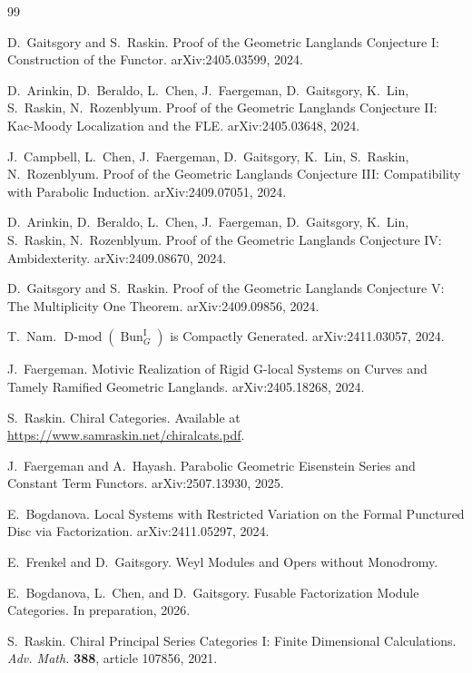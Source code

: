 \documentclass[10pt]{amsart}
\theoremstyle{remark}
\newcommand{\on}[1]{\operatorname{#1}}
\newcommand{\Bun}{\on{Bun}}
\newcommand{\Dmod}{\on{D-mod}}
\begin{document}

\begin{thebibliography}{99}

 D.~Gaitsgory and S.~Raskin. Proof of the Geometric Langlands Conjecture I: Construction of the Functor. arXiv:2405.03599, 2024.

 D.~Arinkin, D.~Beraldo, L.~Chen, J.~Faergeman, D.~Gaitsgory, K.~Lin, S.~Raskin, N.~Rozenblyum. Proof of the Geometric Langlands Conjecture II: Kac-Moody Localization and the FLE. arXiv:2405.03648, 2024.

 J.~Campbell, L.~Chen, J.~Faergeman, D.~Gaitsgory, K.~Lin, S.~Raskin, N.~Rozenblyum. Proof of the Geometric Langlands Conjecture III: Compatibility with Parabolic Induction. arXiv:2409.07051, 2024.

 D.~Arinkin, D.~Beraldo, L.~Chen, J.~Faergeman, D.~Gaitsgory, K.~Lin, S.~Raskin, N.~Rozenblyum. Proof of the Geometric Langlands Conjecture IV: Ambidexterity. arXiv:2409.08670, 2024.

 D.~Gaitsgory and S.~Raskin. Proof of the Geometric Langlands Conjecture V: The Multiplicity One Theorem. arXiv:2409.09856, 2024.

 T.~Nam. $\Dmod(\Bun_G^{\operatorname{I}})$ is Compactly Generated. arXiv:2411.03057, 2024.

 J.~Faergeman. Motivic Realization of Rigid G-local Systems on Curves and Tamely Ramified Geometric Langlands. arXiv:2405.18268, 2024.

 S.~Raskin. Chiral Categories. Available at \url{https://www.samraskin.net/chiralcats.pdf}.

 J.~Faergeman and A.~Hayash. Parabolic Geometric Eisenstein Series and Constant Term Functors. arXiv:2507.13930, 2025.

 E.~Bogdanova. Local Systems with Restricted Variation on the Formal Punctured Disc via Factorization. arXiv:2411.05297, 2024.

 E.~Frenkel and D.~Gaitsgory. Weyl Modules and Opers without Monodromy.

 E.~Bogdanova, L.~Chen, and D.~Gaitsgory. Fusable Factorization Module Categories. In preparation, 2026.

 S.~Raskin. Chiral Principal Series Categories I: Finite Dimensional Calculations. {\it Adv. Math.} {\bf 388}, article 107856, 2021.


\end{thebibliography}
\end{document}
